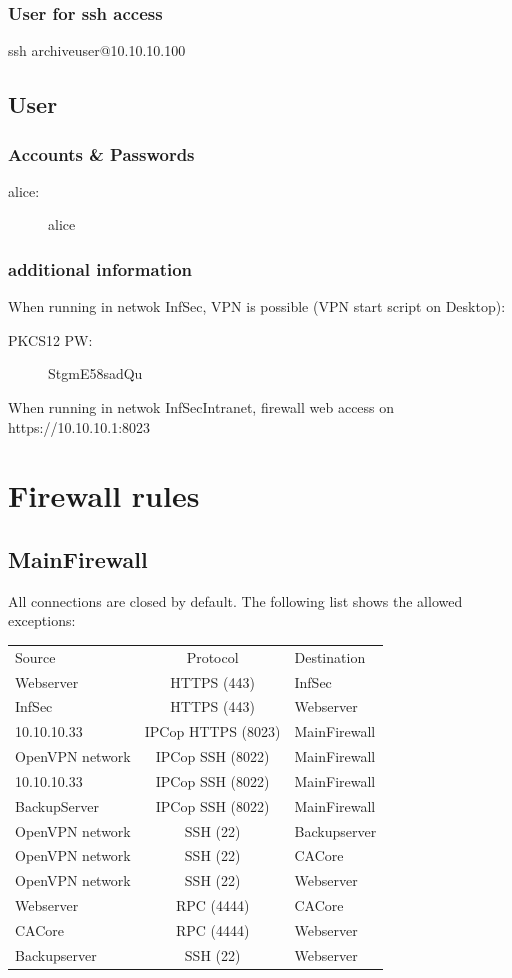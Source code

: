 \documentclass[a4paper,11pt]{article}
\begin{document}
\subsubsection*{User for ssh access}
ssh archiveuser@10.10.10.100

\subsection{User}
\subsubsection*{Accounts \& Passwords}
\begin{description}
\item[alice:] alice
\end{description}
\subsubsection*{additional information}
When running in netwok InfSec, VPN is possible (VPN start script on Desktop):\newline
\begin{description}
\item[PKCS12 PW:] StgmE58sadQu
\end{description}
When running in netwok InfSecIntranet, firewall web access on https://10.10.10.1:8023


\section{Firewall rules}
\subsection{MainFirewall}
All connections are closed by default. The following list shows the allowed exceptions:\newline

\begin{tabular}{l c l}
Source & Protocol & Destination \\
\cline{1-3}
Webserver & HTTPS (443) & InfSec \\
\cline{1-3}
InfSec & HTTPS (443) & Webserver \\
\cline{1-3}
10.10.10.33 & IPCop HTTPS (8023) & MainFirewall\\
\cline{1-3}
OpenVPN network & IPCop SSH (8022) & MainFirewall \\
\cline{1-3}
10.10.10.33 & IPCop SSH (8022) & MainFirewall \\
\cline{1-3}
BackupServer & IPCop SSH (8022) & MainFirewall \\
\cline{1-3}
OpenVPN network & SSH (22) & Backupserver \\
\cline{1-3}
OpenVPN network & SSH (22) & CACore \\
\cline{1-3}
OpenVPN network & SSH (22) & Webserver \\
\cline{1-3}
Webserver & RPC (4444) & CACore \\
\cline{1-3}
CACore & RPC (4444) & Webserver \\
\cline{1-3}
Backupserver & SSH (22) & Webserver \\
\end{tabular}
\end{document}
